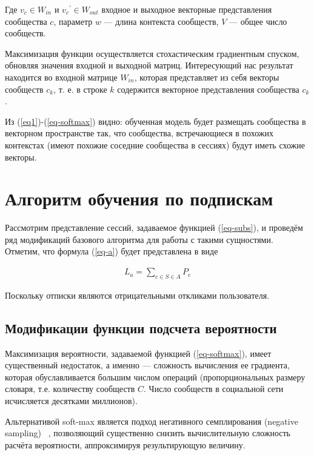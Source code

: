 \documentclass[times,specification,annotation]{itmo-student-thesis}
\begin{document}
Где ${v_c}\in W_{in}$ и ${v_c}^{'} \in W_{out}$ входное и выходное векторные представления сообщества $c$, параметр $w$ --- длина контекста сообществ, $V$ --- общее число сообществ. 

Максимизация функции осуществляется стохастическим градиентным спуском, обновляя значения входной и выходной матриц. Интересующий нас результат находится во входной матрице $W_{in}$, которая представляет из себя векторы сообществ $c_k$, т. е. в строке $k$ содержится векторное
представления сообщества $c_k$.

Из (\ref{eq1})-(\ref{eq-softmax}) видно: обученная модель будет размещать сообщества в векторном пространстве так, что сообщества, встречающиеся в похожих контекстах (имеют похожие соседние сообщества в сессиях) будут иметь схожие векторы.  

\section{Алгоритм обучения по подпискам}\label{sec:algo-subs}
Рассмотрим представление сессий, задаваемое функцией (\ref{eq-subs}), и проведём ряд модификаций базового алгоритма для работы с такими сущностями. Отметим, что формула (\ref{eq-a}) будет представлена в виде

\begin{align}
L_a = \sum_{c \in S \in A} P_c
\label{eq-a-mod}
\end{align}

Поскольку отписки являются отрицательными откликами пользователя.
 
\subsection{Модификации функции подсчета вероятности }\label{sec:prob}
Максимизация вероятности, задаваемой функцией
(\ref{eq-softmax}), имеет существенный недостаток, а именно --- сложность вычисления ее градиента, которая обуславливается большим числом операций (пропорциональных размеру словаря, т.е. количеству сообществ $C$. Число сообществ в социальной сети исчисляется десятками миллионов).

Альтернативой soft-max является подход негативного семплирования (negative sampling) ~\cite{mikolov2013distributed}, позволяющий существенно снизить вычислительную сложность расчёта вероятности, аппроксимируя результирующую величину.
\end{document}
